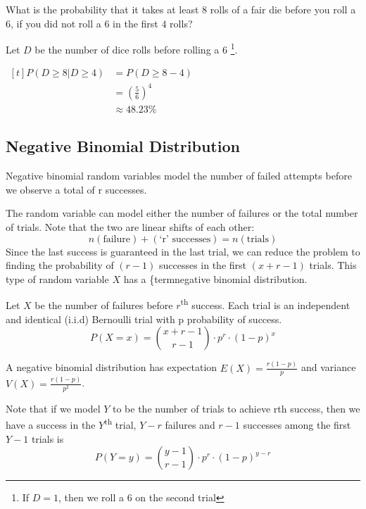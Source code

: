 \begin{example}
    What is the probability that it takes at least $8$ rolls of a fair die before you roll a 6, if you did not roll a 6 in the first $4$ rolls?

    Let $D$ be the number of dice rolls before rolling a 6 \footnote{If $D = 1$, then we roll a $6$ on the second trial}. 

    $\begin{aligned}[t]
        P(D \ge 8 | D \ge 4) & = P(D \ge 8 - 4) \\
                             & = \left( \frac{5}{6} \right)^4 \\
                             & \approx 48.23 \%
    \end{aligned}$
\end{example}

\subsection{Negative Binomial Distribution}

Negative binomial random variables model the number of failed attempts before we observe a total of r successes.

The random variable can model either the number of failures or the total number of trials. Note that the two are linear shifts of each other: $$n(\text{failure}) + (\text{`r' successes}) = n(\text{trials})$$ Since the last success is guaranteed in the last trial, we can reduce the problem to finding the probability of $(r - 1)$ successes in the first $(x + r - 1)$ trials. This type of random variable $X$ has a \{term{negative binomial distribution}.

\begin{definition}
    Let $X$ be the number of failures before $r$\textsuperscript{th} success. Each trial is an independent and identical (i.i.d) Bernoulli trial with p probability of success. 
    $$P(X = x) = \binom{x + r - 1}{r - 1} \cdot p^r \cdot (1 - p)^x$$

    A negative binomial distribution has expectation $E(X) = \frac{r(1-p)}{p}$ and variance $V(X) = \frac{r(1-p)}{p^2}$. 

    Note that if we model $Y$ to be the number of trials to achieve rth success, then we have a success in the $Y$\textsuperscript{th} trial, $Y - r$ failures and $r - 1$ successes among the first $Y - 1$ trials is $$P(Y = y) = \binom{y - 1}{r - 1} \cdot p^r \cdot (1 - p)^{y-r}$$
\end{definition}

